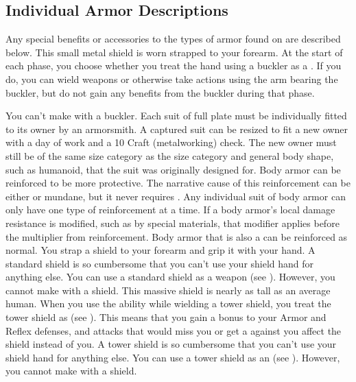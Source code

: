   \subsection{Individual Armor Descriptions}
    Any special benefits or accessories to the types of armor found on  are described below.
     This small metal shield is worn strapped to your forearm.
    At the start of each phase, you choose whether you treat the hand using a buckler as a .
    If you do, you can wield weapons or otherwise take actions using the arm bearing the buckler, but do not gain any benefits from the buckler during that phase.
    \par You can't make  with a buckler.
     Each suit of full plate must be individually fitted to its owner by an armorsmith.
    A captured suit can be resized to fit a new owner with a day of work and a  10 Craft (metalworking) check.
    The new owner must still be of the same size category as the size category and general body shape, such as humanoid, that the suit was originally designed for.
    \label{Reinforcement} Body armor can be reinforced to be more protective.
    The narrative cause of this reinforcement can be either \magical or mundane, but it never requires .
    Any individual suit of body armor can only have one type of reinforcement at a time.
    If a body armor's local damage resistance is modified, such as by special materials, that modifier applies before the multiplier from reinforcement.
    Body armor that is also a  can be reinforced as normal.
     You strap a shield to your forearm and grip it with your hand.
    A standard shield is so cumbersome that you can't use your shield hand for anything else.
    You can use a standard shield as a weapon (see ).
    However, you cannot make  with a shield.
     This massive shield is nearly as tall as an average human.
    When you use the  ability while wielding a tower shield, you treat the tower shield as  (see ).
    This means that you gain a  bonus to your Armor and Reflex defenses, and attacks that would miss you or get a  against you affect the shield instead of you.
    A tower shield is so cumbersome that you can't use your shield hand for anything else.
    You can use a tower shield as an  (see ).
    However, you cannot make  with a shield.

